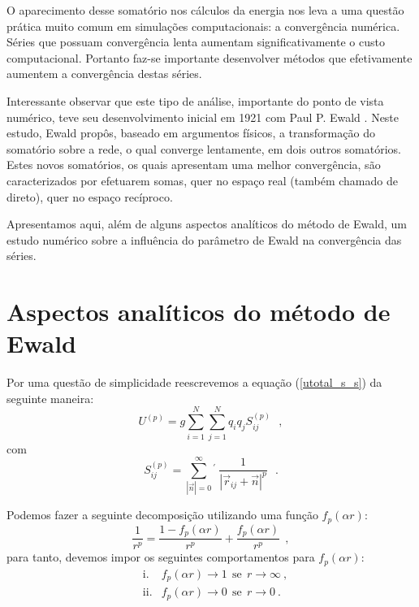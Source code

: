 \documentclass[twocolumn,a4,11pt]{article}
\begin{document}
O aparecimento desse somatório nos cálculos da energia nos leva a uma questão prática muito comum em simulações computacionais: a convergência numérica. Séries que possuam convergência lenta aumentam significativamente o custo computacional. Portanto faz-se importante desenvolver métodos que efetivamente aumentem a convergência destas séries.

Interessante observar que este tipo de análise, importante do ponto de vista numérico, teve seu desenvolvimento inicial em 1921 com Paul P. Ewald \cite{EWA}. Neste estudo, Ewald propôs, baseado em argumentos físicos, a transformação do somatório sobre a rede, o qual converge lentamente, em dois outros somatórios. Estes novos somatórios, os quais apresentam uma melhor convergência, são caracterizados por efetuarem somas, quer no espaço real (também chamado de direto), quer no espaço recíproco.

Apresentamos aqui, além de alguns aspectos analíticos do método de Ewald, um estudo numérico sobre a influência do parâmetro de Ewald na convergência das séries.

\section{Aspectos analíticos do método de Ewald}

\noindent
Por uma questão de simplicidade reescrevemos a equação (\ref{utotal_s_s}) da seguinte maneira:
\begin{equation}
U^{(p)}=g \sum_{i=1}^{N} \sum_{j=1}^{N} q_{i} q_{j} S_{ij}^{(p)} ~~~,
\label{utotal_c_s}
\end{equation}
com
\begin{equation}
S_{ij}^{(p)}=\sum_{|\vec{n}|=0}^{\infty} {}^{\prime} ~
\frac{1}{ \left| \vec{r}_{ij} + \vec{n} \right|^{p} } ~~~.
\label{ptotalum}
\end{equation}

Podemos fazer a seguinte decomposição utilizando uma função $f_{p}(\alpha r)$:
\begin{equation}
\frac{1}{r^{p}}=\frac{1-f_{p}(\alpha r)}{r^{p}} + \frac{f_{p}(\alpha r)}{r^{p}} ~~,
\end{equation}
para tanto, devemos impor os seguintes comportamentos para $f_{p}(\alpha r)$:
\begin{eqnarray*}
& \text{i.}  & f_{p}(\alpha r) \rightarrow 1 ~~\text{se}~~ r \rightarrow \infty ~, \\
& \text{ii.} & f_{p}(\alpha r) \rightarrow 0 ~~\text{se}~~ r \rightarrow 0 ~.
\end{eqnarray*}
\end{document}

